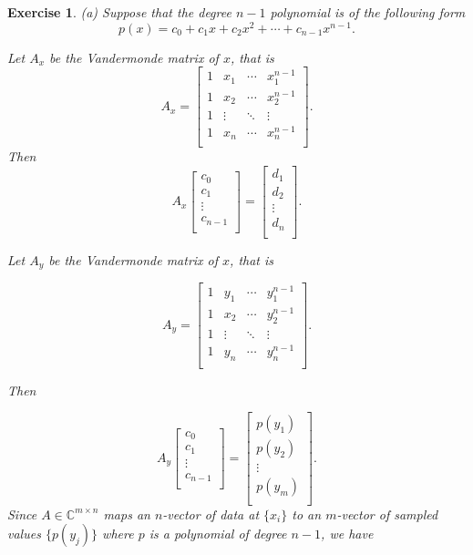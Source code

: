 \documentclass[paper=a4, fontsize=11pt]{scrartcl} %
\numberwithin{equation}{section} %
\numberwithin{figure}{section} %
\numberwithin{table}{section} %
\newtheorem{exercise}{Exercise}
\numberwithin{exercise}{section}
\begin{document}
\begin{exercise}


(a) Suppose that the degree $n-1$ polynomial is of the following form 
$$p(x)=c_0+c_1 x+c_2 x^2 +\cdots +c_{n-1} x^{n-1}.$$


Let $A_{x}$ be the Vandermonde matrix of $x$, that is
$$A_{x}=\begin{bmatrix}
1 & x_{1} & \cdots & x_{1}^{n-1} \\
1 & x_{2} & \cdots & x_{2}^{n-1} \\
1 & \vdots & \ddots & \vdots\\
1 & x_{n} & \cdots & x_{n}^{n-1} \\
\end{bmatrix}.$$
Then $$A_{x}\begin{bmatrix}
c_0\\
c_1\\
\vdots\\
c_{n-1}\\
\end{bmatrix}=\begin{bmatrix}
d_{1}\\
d_{2}\\
\vdots\\
d_{n}\\
\end{bmatrix}.$$


Let $A_{y}$ be the Vandermonde matrix of $x$, that is



$$A_{y}=\begin{bmatrix}
1 & y_{1} & \cdots & y_{1}^{n-1} \\
1 & x_{2} & \cdots & y_{2}^{n-1} \\
1 & \vdots & \ddots & \vdots\\
1 & y_{n} & \cdots & y_{n}^{n-1} \\
\end{bmatrix}.$$

Then 

$$A_{y} \begin{bmatrix}
c_0\\
c_1\\
\vdots\\
c_{n-1}\\
\end{bmatrix}=\begin{bmatrix}
p(y_1)\\
p(y_2)\\
\vdots\\
p(y_m)\\
\end{bmatrix}.$$
Since $A\in \mathbb{C}^{m\times n}$ maps an $n$-vector of data  at $\{x_i\}$ to an $m$-vector of sampled values $\{p(y_j)\}$ where $p$ is a polynomial of degree $n-1$, we have 


\end{exercise}
\end{document}
